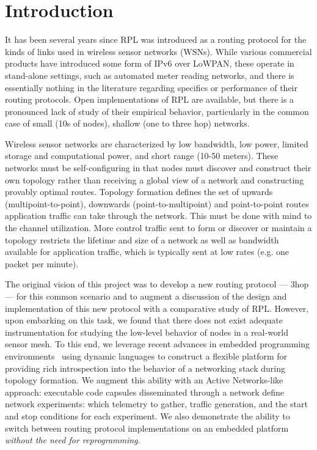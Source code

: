 \section{Introduction}

It has been several years since RPL was introduced as a routing protocol for the kinds of links used in wireless sensor networks (WSNs).
While various commercial products have introduced some form of IPv6 over LoWPAN, these operate in stand-alone settings, such as automated meter reading networks, and there is essentially nothing in the literature regarding specifics or performance of their routing protocols.
Open implementations of RPL are available, but there is a pronounced lack of study of their empirical behavior, particularly in the common case of small (10s of nodes), shallow (one to three hop) networks.

Wireless sensor networks are characterized by low bandwidth, low power, limited storage and computational power, and short range (10-50 meters).
These networks must be self-configuring in that nodes must discover and construct their own topology rather than receiving a global view of a network and constructing provably optimal routes.
Topology formation defines the set of upwards (multipoint-to-point), downwards (point-to-multipoint) and point-to-point routes application traffic can take through the network.
This must be done with mind to the channel utilization.
More control traffic sent to form or discover or maintain a topology restricts the lifetime and size of a network as well as bandwidth available for application traffic, which is typically sent at low rates (e.g. one packet per minute).

The original vision of this project was to develop a new routing protocol --- 3hop --- for this common scenario and to augment a discussion of the design and implementation of this new protocol with a comparative study of RPL.
However, upon embarking on this task, we found that there does not exist adequate instrumentation for studying the low-level behavior of nodes in a real-world sensor mesh.
To this end, we leverage recent advances in embedded programming environments~\cite{andersen2016system} using dynamic languages to construct a flexible platform for providing rich introspection into the behavior of a networking stack during topology formation.
We augment this ability with an Active Networks-like approach: executable code capsules disseminated through a network define network experiments: which telemetry to gather, traffic generation, and the start and stop conditions for each experiment.
We also demonstrate the ability to switch between routing protocol implementations on an embedded platform \emph{without the need for reprogramming}.

